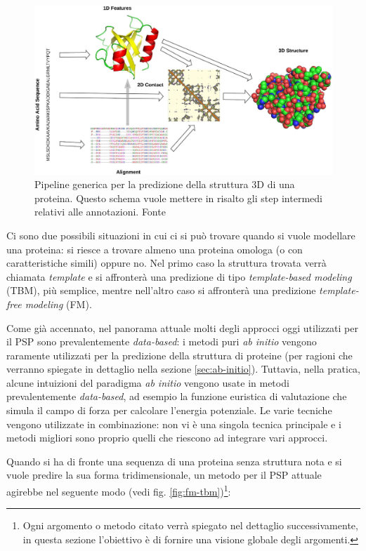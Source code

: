 {\begin{figure}[!htb]
	\centering
	\includegraphics[scale=1]{images/psa.jpg}
	\caption{Pipeline generica per la predizione della struttura 3D di una proteina. Questo schema vuole mettere in risalto gli step intermedi relativi alle annotazioni. Fonte\cite{torrisi2020deep}}
	\label{fig:psa}
\end{figure}

Ci sono due possibili situazioni in cui ci si può trovare quando si vuole modellare una proteina: si riesce a trovare almeno una proteina omologa (o con caratteristiche simili) oppure no. Nel primo caso la struttura trovata verrà chiamata \textit{template} e si affronterà una predizione di tipo \textit{template-based modeling} (TBM), più semplice, mentre nell'altro caso si affronterà una predizione \textit{template-free modeling} (FM).\\


\par Come già accennato, nel panorama attuale molti degli approcci oggi utilizzati per il PSP sono prevalentemente \textit{data-based}: i metodi puri \textit{ab initio} vengono raramente utilizzati per la predizione della struttura di proteine (per ragioni che verranno spiegate in dettaglio nella sezione \ref{sec:ab-initio}). Tuttavia, nella pratica, alcune intuizioni del paradigma \textit{ab initio} vengono usate in metodi prevalentemente \textit{data-based}, ad esempio la funzione euristica di valutazione che simula il campo di forza per calcolare l'energia potenziale. Le varie tecniche vengono utilizzate in combinazione: non vi è una singola tecnica principale e i metodi migliori sono proprio quelli che riescono ad integrare vari approcci. \\

\par  Quando si ha di fronte una sequenza di una proteina senza struttura nota e si vuole predire la sua forma tridimensionale, un metodo per il PSP attuale agirebbe nel seguente modo (vedi fig. \ref{fig:fm-tbm})\footnote{Ogni argomento o metodo citato verrà spiegato nel dettaglio successivamente, in questa sezione l'obiettivo è di fornire una visione globale degli argomenti.}:

}
